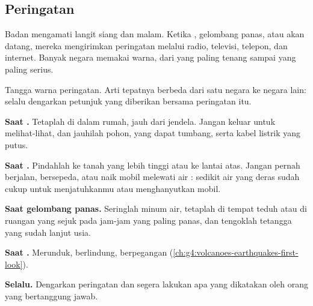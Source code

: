 \subsection*{Peringatan}

Badan  mengamati langit siang dan malam. Ketika , gelombang
panas, atau  akan datang, mereka mengirimkan peringatan melalui
radio, televisi, telepon, dan internet. Banyak negara memakai warna, dari
yang paling tenang sampai yang paling serius.

\begin{omfigure}

{\small Tangga warna peringatan. Arti tepatnya berbeda dari satu negara ke
negara lain: selalu dengarkan petunjuk yang diberikan bersama peringatan
itu.}
\end{omfigure}

\begin{safety}
\textbf{Saat .} Tetaplah di dalam rumah, jauh dari jendela. Jangan
keluar untuk melihat-lihat, dan jauhilah pohon, yang dapat tumbang, serta
kabel listrik yang putus.

\textbf{Saat .} Pindahlah ke tanah yang lebih tinggi atau ke lantai
atas. Jangan pernah berjalan, bersepeda, atau naik mobil melewati air
: sedikit air yang deras sudah cukup untuk menjatuhkanmu atau
menghanyutkan mobil.

\textbf{Saat gelombang panas.} Seringlah minum air, tetaplah di tempat teduh
atau di ruangan yang sejuk pada jam-jam yang paling panas, dan tengoklah
tetangga yang sudah lanjut usia.

\textbf{Saat .} Merunduk, berlindung, berpegangan
(\cref{ch:g4:volcanoes-earthquakes-first-look}).

\textbf{Selalu.} Dengarkan peringatan dan segera lakukan apa yang
dikatakan oleh orang yang bertanggung jawab.
\end{safety}

